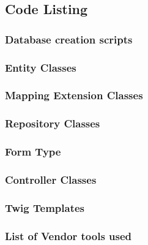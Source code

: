 \documentclass[a4paper,12pt]{article}
\begin{document}
\subsection {Code Listing}

\subsubsection {Database creation scripts}
\subsubsection {Entity Classes}
\subsubsection {Mapping Extension Classes}
\subsubsection {Repository Classes}
\subsubsection {Form Type}
\subsubsection {Controller Classes}
\subsubsection {Twig Templates}
\subsubsection {List of Vendor tools used}
\end{document}
